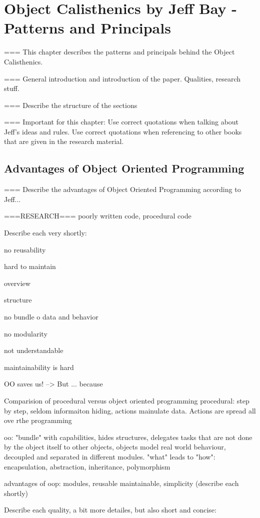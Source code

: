 \chapter{Object Calisthenics by Jeff Bay - Patterns and Principals}
\label{Description}
=== This chapter describes the patterns and principals behind the Object Calisthenics. 

=== General introduction and introduction of the paper. Qualities, research stuff.

=== Describe the structure of the sections

=== Important for this chapter: Use correct quotations when talking about Jeff's ideas and rules. Use correct quotations when referencing to other books that are given in the research material. 

\section{Advantages of Object Oriented Programming}
=== Describe the advantages of Object Oriented Programming according to Jeff...

===RESEARCH===
poorly written code, procedural code

Describe each very shortly: 

no reusability

hard to maintain

overview

structure

no bundle o data and behavior

no modularity

not understandable

maintainability is hard

OO saves us! --> But ... because

Comparision of procedural versus object oriented programming
procedural: step by step, seldom informaiton hiding, actions mainulate data. Actions are spread all ove rthe programming

oo: "bundle" with capabilities, hides structures, delegates tasks that are not done by the object itself to other objects, objects model real world behaviour, decoupled and separated in different modules. "what" leads to "how": encapsulation, abstraction, inheritance, polymorphism

advantages of oop: modules, reusable maintainable, simplicity (describe each shortly) 

Describe each quality, a bit more detailes, but also short and concise: 

